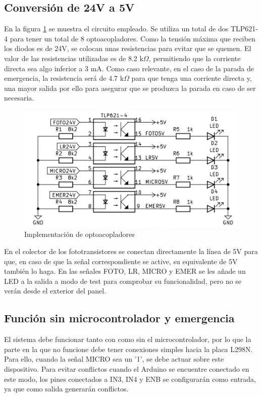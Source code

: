 \smallskip

\subsection{Conversión de 24V a 5V}
En la figura \ref{fig:figura34imp} se muestra el circuito empleado. Se utiliza un total de dos TLP621-4 para
tener un total de 8 optoacopladores. Como la tensión máxima que reciben los diodos es de 24V, se colocan
unas resistencias para evitar que se quemen. El valor de las resistencias utilizadas es de 8.2 k$\Omega$,
permitiendo que la corriente directa sea algo inferior a 3 mA. Como caso relevante, en el caso de la parada
de emergencia, la resistencia será de 4.7 k$\Omega$ para que tenga una corriente directa y, una mayor
salida por ello para asegurar que se produzca la parada en caso de ser necesaria.

\begin{figure}[hbtp]
    \centering
    \includegraphics[scale=1.25]{03-placa/03-optoacopladores.png}
    \caption{Implementación de optoacopladores}
    \label{fig:figura34imp}
    \end{figure}

En el colector de los fototransistores se conectan directamente la línea de 5V para que, en caso de que la señal correspondiente se active, su equivalente de 5V también lo haga. En las señales FOTO, LR, MICRO y EMER se les añade un LED a la salida a modo de test para comprobar su funcionalidad, pero no se verán desde el exterior del panel.

\subsection{Función sin microcontrolador y emergencia}

El sistema debe funcionar tanto con como sin el microcontrolador, por lo que la parte en la que no funcione
debe tener conexiones simples hacia la placa L298N. Para ello, cuando la señal MICRO sea un '1', se debe 
actuar sobre este dispositivo. Para evitar conflictos cuando el Arduino se encuentre conectado en este modo,
los pines conectados a IN3, IN4 y ENB se configurarán como entrada, ya que como salida generarán conflictos.

